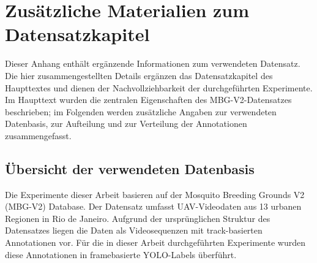 
\clearpage
\appendix
\renewcommand{\appendixname}{Anhang}
\renewcommand{\appendixpagename}{Anhang}
\renewcommand{\appendixtocname}{Anhang}
\addappheadtotoc
\appendixpage


\section{Zusätzliche Materialien zum Datensatzkapitel}
\label{app:datensatz}

Dieser Anhang enthält ergänzende Informationen zum verwendeten Datensatz.
Die hier zusammengestellten Details ergänzen das Datensatzkapitel des Haupttextes
und dienen der Nachvollziehbarkeit der durchgeführten Experimente. Im Haupttext
wurden die zentralen Eigenschaften des MBG-V2-Datensatzes beschrieben; im
Folgenden werden zusätzliche Angaben zur verwendeten Datenbasis, zur Aufteilung
und zur Verteilung der Annotationen zusammengefasst.

\subsection{Übersicht der verwendeten Datenbasis}

Die Experimente dieser Arbeit basieren auf der Mosquito Breeding Grounds V2
(MBG-V2) Database. Der Datensatz umfasst UAV-Videodaten aus 13 urbanen
Regionen in Rio de Janeiro. Aufgrund der ursprünglichen Struktur des Datensatzes
liegen die Daten als Videosequenzen mit track-basierten Annotationen vor. Für
die in dieser Arbeit durchgeführten Experimente wurden diese Annotationen in
framebasierte YOLO-Labels überführt.

